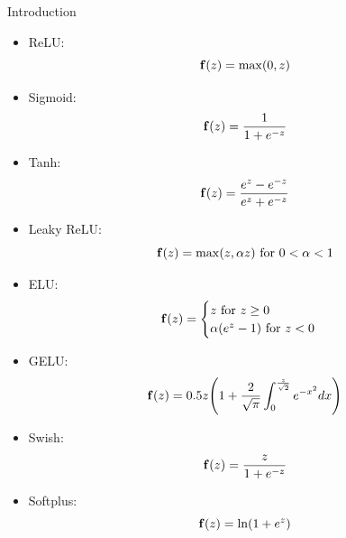 \documentclass[10pt]{beamer}
\theoremstyle{remark}
\theoremstyle{definition}
\begin{document}
\begin{frame}[allowframebreaks]{Introduction}
	\begin{itemize}
		\item ReLU:
		\begin{equation*}
			\bold{f}(z) = \max(0, z)
		\end{equation*}
		\item Sigmoid:
		\begin{equation*}
			\bold{f}(z) = \dfrac{1}{1 + e^{-z}}
		\end{equation*}
		\item Tanh:
		\begin{equation*}
			\bold{f}(z) = \dfrac{e^z - e^{-z}}{e^z + e^{-z}}
		\end{equation*}
		\item Leaky ReLU:
		\begin{equation*}
			\bold{f}(z)=\max(z, \alpha z) \text{ for } 0 < \alpha < 1
		\end{equation*}
		\item ELU:
		\begin{equation*}
			\bold{f}(z) = \begin{cases} z \text{ for } z \geq 0 \\ \alpha (e^z - 1) \text{ for } z < 0 \end{cases}
		\end{equation*}
		\item GELU:
		\begin{equation*}
			\bold{f}(z)=0.5 z \Bigg( 1 + \dfrac{2}{\sqrt{\pi}} \int_0^{\frac{z}{\sqrt{2}}} e^{-x^2}dx \Bigg)
		\end{equation*}
		\item Swish:
		\begin{equation*}
			\bold{f}(z) = \dfrac{z}{1 + e^{-z}}
		\end{equation*}
		\item Softplus:
		\begin{equation*}
			\bold{f}(z) = \ln(1 + e^z)
		\end{equation*}
	\end{itemize}


\end{frame}
\end{document}
